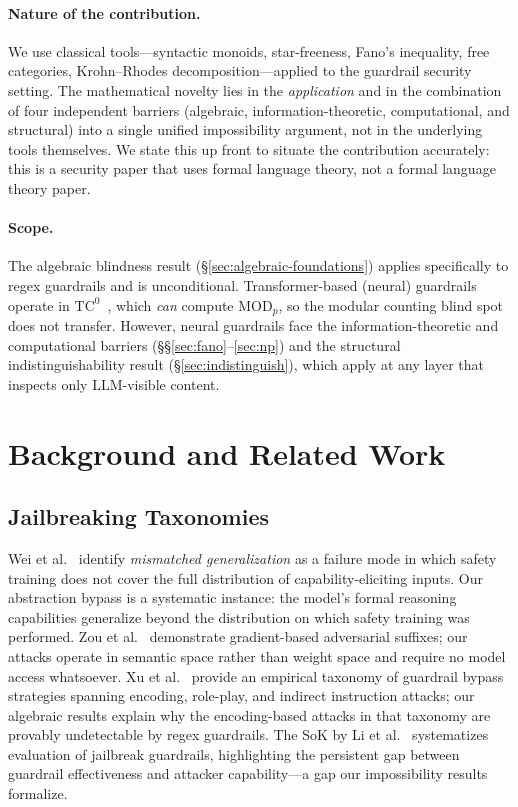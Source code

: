 \documentclass[letterpaper,twocolumn,10pt]{article}
\theoremstyle{definition}
\theoremstyle{remark}
\begin{document}
\paragraph{Nature of the contribution.}
We use classical tools---syntactic monoids, star-freeness, Fano's inequality,
free categories, Krohn--Rhodes decomposition---applied to the guardrail security
setting.
The mathematical novelty lies in the \emph{application} and in the combination
of four independent barriers (algebraic, information-theoretic, computational,
and structural) into a single unified impossibility argument, not in the
underlying tools themselves.
We state this up front to situate the contribution accurately: this is a
security paper that uses formal language theory, not a formal language theory
paper.

\paragraph{Scope.}
The algebraic blindness result (\S\ref{sec:algebraic-foundations}) applies
specifically to regex guardrails and is unconditional.
Transformer-based (neural) guardrails operate in $\mathrm{TC}^0$~\cite{merrill2023saturated,chiang2023tighter},
which \emph{can} compute $\mathrm{MOD}_p$, so the modular counting blind spot does
not transfer.
However, neural guardrails face the information-theoretic and computational barriers
(\S\S\ref{sec:fano}--\ref{sec:np}) and the structural indistinguishability result
(\S\ref{sec:indistinguish}), which apply at any layer that inspects only LLM-visible content.

\section{Background and Related Work}\label{sec:related}

\subsection{Jailbreaking Taxonomies}\label{sec:related-jailbreak}

Wei et al.~\cite{wei2023jailbroken} identify \emph{mismatched generalization} as
a failure mode in which safety training does not cover the full distribution of
capability-eliciting inputs.
Our abstraction bypass is a systematic instance: the model's formal reasoning
capabilities generalize beyond the distribution on which safety training was
performed.
Zou et al.~\cite{zou2023universal} demonstrate gradient-based adversarial suffixes;
our attacks operate in semantic space rather than weight space and require no model
access whatsoever.
Xu et al.~\cite{bypassing_empirical2025} provide an empirical taxonomy of guardrail
bypass strategies spanning encoding, role-play, and indirect instruction attacks;
our algebraic results explain why the encoding-based attacks in that taxonomy are
provably undetectable by regex guardrails.
The SoK by Li et al.~\cite{sok_jailbreak2025} systematizes evaluation of jailbreak
guardrails, highlighting the persistent gap between guardrail effectiveness and
attacker capability---a gap our impossibility results formalize.
\end{document}
